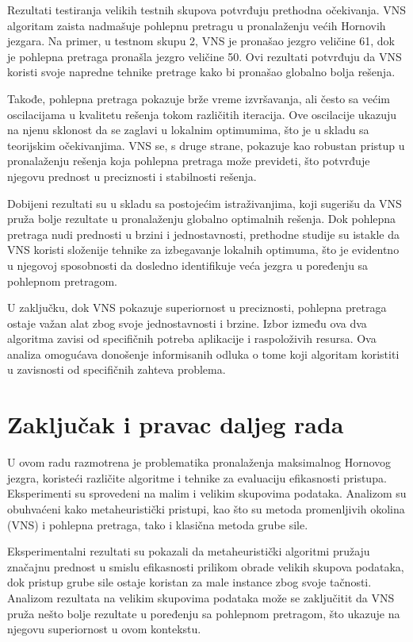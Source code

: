 \documentclass[12pt,oneside]{memoir}
\begin{document}
Rezultati testiranja velikih testnih skupova potvrđuju prethodna očekivanja. VNS algoritam zaista nadmašuje pohlepnu pretragu u pronalaženju većih Hornovih jezgara. Na primer, u testnom skupu 2, VNS je pronašao jezgro veličine 61, dok je pohlepna pretraga pronašla jezgro veličine 50. Ovi rezultati potvrđuju da VNS koristi svoje napredne tehnike pretrage kako bi pronašao globalno bolja rešenja.

Takođe, pohlepna pretraga pokazuje brže vreme izvršavanja, ali često sa većim oscilacijama u kvalitetu rešenja tokom različitih iteracija. Ove oscilacije ukazuju na njenu sklonost da se zaglavi u lokalnim optimumima, što je u skladu sa teorijskim očekivanjima. VNS se, s druge strane, pokazuje kao robustan pristup u pronalaženju rešenja koja pohlepna pretraga može prevideti, što potvrđuje njegovu prednost u preciznosti i stabilnosti rešenja.

Dobijeni rezultati su u skladu sa postojećim istraživanjima, koji sugerišu da VNS pruža bolje rezultate u pronalaženju globalno optimalnih rešenja. Dok pohlepna pretraga nudi prednosti u brzini i jednostavnosti, prethodne studije su istakle da VNS koristi složenije tehnike za izbegavanje lokalnih optimuma, što je evidentno u njegovoj sposobnosti da dosledno identifikuje veća jezgra u poređenju sa pohlepnom pretragom.

U zaključku, dok VNS pokazuje superiornost u preciznosti, pohlepna pretraga ostaje važan alat zbog svoje jednostavnosti i brzine. Izbor između ova dva algoritma zavisi od specifičnih potreba aplikacije i raspoloživih resursa. Ova analiza omogućava donošenje informisanih odluka o tome koji algoritam koristiti u zavisnosti od specifičnih zahteva problema.

\chapter{Zaključak i pravac daljeg rada}

U ovom radu razmotrena je problematika pronalaženja maksimalnog Hornovog jezgra, koristeći različite algoritme i tehnike za evaluaciju efikasnosti pristupa. Eksperimenti su sprovedeni na malim i velikim skupovima podataka. Analizom su obuhvaćeni kako metaheuristički pristupi, kao što su metoda promenljivih okolina (VNS) i pohlepna pretraga, tako i klasična metoda grube sile. 

Eksperimentalni rezultati su pokazali da metaheuristički algoritmi pružaju značajnu prednost u smislu efikasnosti prilikom obrade velikih skupova podataka, dok pristup grube sile ostaje koristan za male instance zbog svoje tačnosti.
Analizom rezultata na velikim skupovima podataka može se zaključitit da VNS pruža nešto bolje rezultate u poređenju sa pohlepnom pretragom, što ukazuje na njegovu superiornost u ovom kontekstu.
\end{document}
